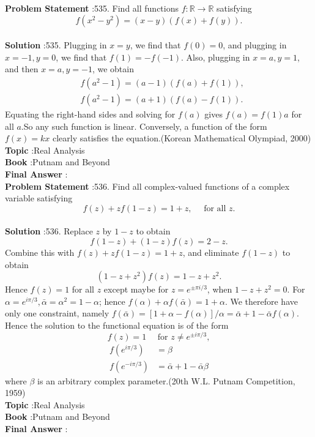 \documentclass[10pt]{article}
\begin{document}
\textbf{Problem Statement} :535. Find all functions $f: \mathbb{R} \rightarrow \mathbb{R}$ satisfying$$ f\left(x^{2}-y^{2}\right)=(x-y)(f(x)+f(y)) . $$\\
\textbf{Solution} :535. Plugging in $x=y$, we find that $f(0)=0$, and plugging in $x=-1, y=0$, we find that $f(1)=-f(-1)$. Also, plugging in $x=a, y=1$, and then $x=a, y=-1$, we obtain$$ \begin{aligned} &f\left(a^{2}-1\right)=(a-1)(f(a)+f(1)), \\ &f\left(a^{2}-1\right)=(a+1)(f(a)-f(1)) . \end{aligned} $$Equating the right-hand sides and solving for $f(a)$ gives $f(a)=f(1) a$ for all $a$.So any such function is linear. Conversely, a function of the form $f(x)=k x$ clearly satisfies the equation.(Korean Mathematical Olympiad, 2000)\\
\textbf{Topic} :Real Analysis\\
\textbf{Book} :Putnam and Beyond\\
\textbf{Final Answer} :\\


\textbf{Problem Statement} :536. Find all complex-valued functions of a complex variable satisfying$$ f(z)+z f(1-z)=1+z, \quad \text { for all } z . $$\\
\textbf{Solution} :536. Replace $z$ by $1-z$ to obtain$$ f(1-z)+(1-z) f(z)=2-z . $$Combine this with $f(z)+z f(1-z)=1+z$, and eliminate $f(1-z)$ to obtain$$ \left(1-z+z^{2}\right) f(z)=1-z+z^{2} . $$Hence $f(z)=1$ for all $z$ except maybe for $z=e^{\pm \pi i / 3}$, when $1-z+z^{2}=0$. For $\alpha=e^{i \pi / 3}, \bar{\alpha}=\alpha^{2}=1-\alpha$; hence $f(\alpha)+\alpha f(\bar{\alpha})=1+\alpha$. We therefore have only one constraint, namely $f(\bar{\alpha})=[1+\alpha-f(\alpha)] / \alpha=\bar{\alpha}+1-\bar{\alpha} f(\alpha)$. Hence the solution to the functional equation is of the form$$ f(z)=1 \quad \text { for } z \neq e^{\pm i \pi / 3}, $$$$ \begin{aligned} f\left(e^{i \pi / 3}\right) &=\beta \\ f\left(e^{-i \pi / 3}\right) &=\bar{\alpha}+1-\bar{\alpha} \beta \end{aligned} $$where $\beta$ is an arbitrary complex parameter.(20th W.L. Putnam Competition, 1959)\\
\textbf{Topic} :Real Analysis\\
\textbf{Book} :Putnam and Beyond\\
\textbf{Final Answer} :\\
\end{document}

